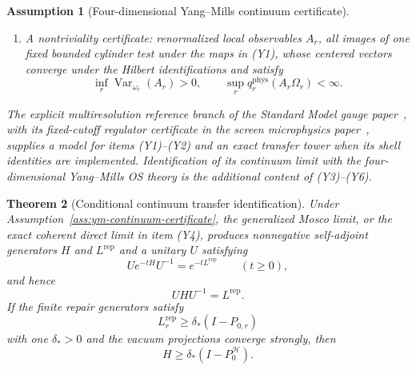 \documentclass[11pt]{article}
\numberwithin{equation}{section}
\newtheorem{theorem}{Theorem}[section]
\newtheorem{assumption}[theorem]{Assumption}
\theoremstyle{remark}
\newcommand{\Rep}{\mathrm{rep}}
\newcommand{\Hcal}{\mathcal H}
\begin{document}
\begin{assumption}[Four-dimensional Yang--Mills continuum certificate]
\begin{enumerate}[label=\textup{(Y\arabic*)},leftmargin=2em]
physical vacuum projection is
\(P_0^{\Hcal}:=U^{-1}P_0^KU=|\Omega\rangle\langle\Omega|\).
On the dense time-zero cylinder core, the finite Markov/OS identity
\[
\omega_r^{(4)}\!\left(
(\iota_{0,r}f)^*\tau_t^{(r)}(\iota_{0,r}g)
\right)
=\langle f,e^{-tL_r^{\Rep}}g\rangle_{K_r}
=\langle U_r^{-1}f,e^{-tH_r}U_r^{-1}g\rangle_{\Hcal_r}
\]
holds and passes to the limit. Thus the OS-reconstructed time-zero Hilbert space and Hamiltonian
are the same \((\Hcal,H)\) as the transfer-form limit, not a second pair with reused notation.
\item A nontriviality certificate: renormalized local observables \(A_r\), all images of one fixed
bounded cylinder test under the maps in (Y1), whose centered vectors converge under the Hilbert
identifications and satisfy
\[
\inf_r\operatorname{Var}_{\omega_r}(A_r)>0,\qquad
\sup_r q_r^{\mathrm{phys}}(A_r\Omega_r)<\infty .
\]
\end{enumerate}
The explicit multiresolution reference branch of the Standard Model gauge paper~\cite{oph2}, with
its fixed-cutoff regulator certificate in the screen microphysics paper~\cite{oph5}, supplies a
model for items (Y1)--(Y2) and an exact transfer tower when its shell identities are implemented. Identification
of its continuum limit with the four-dimensional Yang--Mills OS theory is the additional content
of (Y3)--(Y6).
\end{assumption}

\begin{theorem}[Conditional continuum transfer identification]
\label{thm:continuum}
Under Assumption~\ref{ass:ym-continuum-certificate}, the generalized Mosco limit, or the exact
coherent direct limit in item (Y4), produces nonnegative self-adjoint generators \(H\) and
\(L^{\mathrm{rep}}\) and a unitary \(U\) satisfying
\[
U e^{-tH}U^{-1}=e^{-tL^{\mathrm{rep}}}
\qquad(t\ge0),
\tag{8}
\]
and hence
\[
UHU^{-1}=L^{\mathrm{rep}}.
\tag{9}
\]
If the finite repair generators satisfy
\[
L_r^{\Rep}\ge \delta_*(I-P_{0,r})
\]
with one \(\delta_*>0\) and the vacuum projections converge strongly, then
\[
H\ge \delta_*(I-P_0^{\Hcal}).
\]
\end{theorem}
\end{document}
